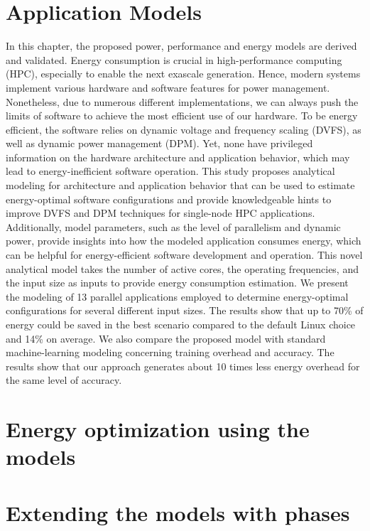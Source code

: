 \documentclass[
papersize=a4,
pagelayout=default,
fontname=latinmodern,
fontsize=11pt,
twoside,
final,
faculty=fpms,
]{umons-Thesis}
\begin{document}
	\chapter{Application Models} \label{chapter:models}
	In this chapter, the proposed power, performance and energy models are derived and validated.
	Energy consumption is crucial in high-performance computing (HPC), especially to enable the next exascale generation. Hence, modern systems implement various hardware and software features for power management. Nonetheless, due to numerous different implementations, we can always push the limits of software to achieve the most efficient use of our hardware. To be
	energy efficient, the software relies on dynamic voltage and frequency scaling (DVFS), as well as dynamic power management (DPM). Yet, none have privileged information on the hardware architecture and application behavior, which may lead to energy-inefficient software operation. 
	This study  proposes analytical modeling for architecture and application behavior that can be used to estimate energy-optimal software configurations and provide knowledgeable hints to improve DVFS and DPM techniques for single-node HPC applications.
	Additionally, model parameters, such as the level of parallelism and dynamic power, provide insights into how the modeled application consumes energy, which can be helpful for energy-efficient software development and operation.
	This novel analytical model takes the number of active cores, the operating frequencies, and the input size as inputs to provide energy consumption estimation.
	We present the modeling of 13 parallel applications employed to determine energy-optimal configurations for several different input sizes.
	The results show that up to 70\% of energy could be saved in the best scenario compared to the default Linux choice and 14\% on average.
	We also compare the proposed model with standard machine-learning modeling concerning training overhead and accuracy. The results show that our approach generates about 10 times less energy overhead for the same level of accuracy.
	
	
	\chapter{Energy optimization using the models}
	
	
	
	\chapter{Extending the models with phases}
	
	
\end{document}
